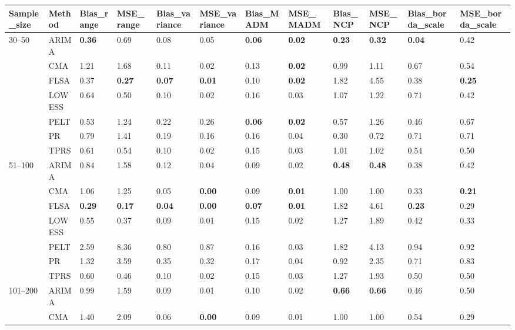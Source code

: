 \begin{table}[ht]
\centering
\begin{tabular}{llllllllllll}
  \toprule
Sample_size & Method & Bias_range & MSE_range & Bias_variance & MSE_variance & Bias_MADM & MSE_MADM & Bias_NCP & MSE_NCP & Bias_borda_scale & MSE_borda_scale \\ 
  \midrule
30–50 & ARIMA & \textbf{0.36} & 0.69 & 0.08 & 0.05 & \textbf{0.06} & \textbf{0.02} & \textbf{0.23} & \textbf{0.32} & \textbf{0.04} & 0.42 \\ 
   & CMA & 1.21 & 1.68 & 0.11 & 0.02 & 0.13 & \textbf{0.02} & 0.99 & 1.11 & 0.67 & 0.54 \\ 
   & FLSA & 0.37 & \textbf{0.27} & \textbf{0.07} & \textbf{0.01} & 0.10 & \textbf{0.02} & 1.82 & 4.55 & 0.38 & \textbf{0.25} \\ 
   & LOWESS & 0.64 & 0.50 & 0.10 & 0.02 & 0.16 & 0.03 & 1.07 & 1.22 & 0.71 & 0.42 \\ 
   & PELT & 0.53 & 1.24 & 0.22 & 0.26 & \textbf{0.06} & \textbf{0.02} & 0.57 & 1.26 & 0.46 & 0.67 \\ 
   & PR & 0.79 & 1.41 & 0.19 & 0.16 & 0.16 & 0.04 & 0.30 & 0.72 & 0.71 & 0.71 \\ 
   & TPRS & 0.61 & 0.54 & 0.10 & 0.02 & 0.15 & 0.03 & 1.01 & 1.02 & 0.54 & 0.50 \\ 
  51–100 & ARIMA & 0.84 & 1.58 & 0.12 & 0.04 & 0.09 & 0.02 & \textbf{0.48} & \textbf{0.48} & 0.38 & 0.42 \\ 
   & CMA & 1.06 & 1.25 & 0.05 & \textbf{0.00} & 0.09 & \textbf{0.01} & 1.00 & 1.00 & 0.33 & \textbf{0.21} \\ 
   & FLSA & \textbf{0.29} & \textbf{0.17} & \textbf{0.04} & \textbf{0.00} & \textbf{0.07} & \textbf{0.01} & 1.82 & 4.61 & \textbf{0.23} & 0.29 \\ 
   & LOWESS & 0.55 & 0.37 & 0.09 & 0.01 & 0.15 & 0.02 & 1.27 & 1.89 & 0.42 & 0.33 \\ 
   & PELT & 2.59 & 8.36 & 0.80 & 0.87 & 0.16 & 0.03 & 1.82 & 4.13 & 0.94 & 0.92 \\ 
   & PR & 1.32 & 3.59 & 0.35 & 0.32 & 0.17 & 0.04 & 0.92 & 2.35 & 0.71 & 0.83 \\ 
   & TPRS & 0.60 & 0.46 & 0.10 & 0.02 & 0.15 & 0.03 & 1.27 & 1.93 & 0.50 & 0.50 \\ 
  101–200 & ARIMA & 0.99 & 1.59 & 0.09 & 0.01 & 0.10 & 0.02 & \textbf{0.66} & \textbf{0.66} & 0.46 & 0.50 \\ 
   & CMA & 1.40 & 2.09 & 0.06 & \textbf{0.00} & 0.09 & 0.01 & 1.00 & 1.00 & 0.54 & 0.29 \\ 

\end{tabular}
\end{table}
